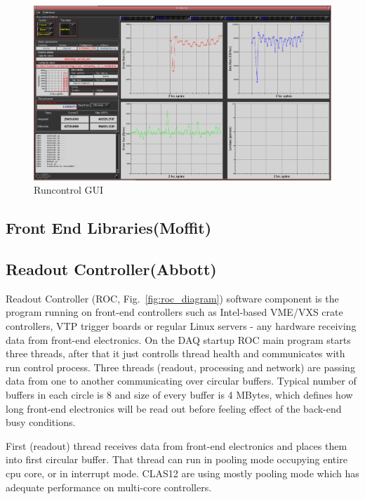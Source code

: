 \begin{figure}[hbt]
	\centering
	\includegraphics[width=1.0\columnwidth,keepaspectratio]{img/runcontrol1.png}
	\caption{Runcontrol GUI}
	\label{fig:runcontrol1}
\end{figure}



\subsection{Front End Libraries(Moffit)}




\subsection{Readout Controller(Abbott)}

Readout Controller (ROC, Fig.~\ref{fig:roc_diagram}) software component is the program running on front-end controllers such as Intel-based VME/VXS crate controllers, VTP trigger boards or regular Linux servers - any hardware receiving data from front-end electronics. On the DAQ startup ROC main program starts three threads, after that it just controlls thread health and communicates with run control process. Three threads (readout, processing and network) are passing data from one to another communicating over circular buffers. Typical number of buffers in each circle is 8 and size of every buffer is 4 MBytes, which defines how long front-end electronics will be read out before feeling effect of the back-end busy conditions.

First (readout) thread receives data from front-end electronics and places them into first circular buffer. That thread can run in pooling mode occupying entire cpu core, or in interrupt mode. CLAS12 are using mostly pooling mode which has adequate performance on multi-core controllers.

